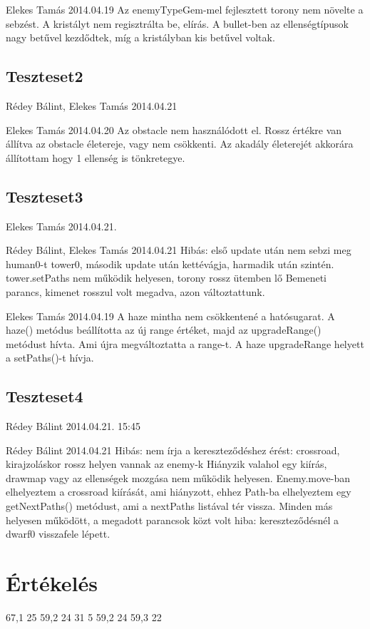 \tesztfail
{Elekes Tamás}
{2014.04.19}
{Az enemyTypeGem-mel fejlesztett torony nem növelte a sebzést.}
{A kristályt nem regisztrálta be, elírás.}
{A bullet-ben az ellenségtípusok nagy betűvel kezdődtek, míg a kristályban kis betűvel voltak.}
\subsection{Teszteset2}

\tesztok
{Rédey Bálint, Elekes Tamás}
{2014.04.21}

\tesztfail
{Elekes Tamás}
{2014.04.20}
{Az obstacle nem használódott el.}
{Rossz értékre van állítva az obstacle életereje, vagy nem csökkenti.}
{Az akadály életerejét akkorára állítottam hogy 1 ellenség is tönkretegye.}

\subsection{Teszteset3}

\tesztok
{Elekes Tamás}
{2014.04.21.}

\tesztfail
{Rédey Bálint, Elekes Tamás}
{2014.04.21}
{Hibás: első update után nem sebzi meg human0-t tower0, második update után kettévágja, harmadik után szintén.}
{tower.setPaths nem működik helyesen, torony rossz ütemben lő}
{Bemeneti parancs, kimenet rosszul volt megadva, azon változtattunk.}

\tesztfail
{Elekes Tamás}
{2014.04.19}
{A haze mintha nem csökkentené a hatósugarat.}
{A haze() metódus beállította az új range értéket, majd az upgradeRange() metódust hívta. Ami újra megváltoztatta a range-t.}
{A haze upgradeRange helyett a setPaths()-t hívja.}

\subsection{Teszteset4}

\tesztok
{Rédey Bálint}
{2014.04.21. 15:45}

\tesztfail
{Rédey Bálint}
{2014.04.21}
{Hibás: nem írja a kereszteződéshez érést: crossroad, kirajzoláskor rossz helyen vannak az enemy-k}
{Hiányzik valahol egy kiírás, drawmap vagy az ellenségek mozgása nem működik helyesen.}
{Enemy.move-ban elhelyeztem a crossroad kiírását, ami hiányzott, ehhez Path-ba elhelyeztem egy getNextPaths() metódust, ami a nextPaths listával tér vissza. Minden más helyesen működött, a megadott parancsok közt volt hiba: kereszteződésnél a dwarf0 visszafele lépett.}

\section{Értékelés}


\begin{ertekelesplusz}
{67,1} %
{25}        %
{59,2}
{24}
{31}
{5}
{59,2}
{24}
{59,3}
{22}

\end{ertekelesplusz}
